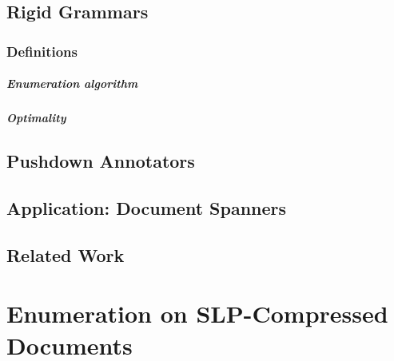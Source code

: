 \documentclass[pdftex]{pucthesis}	%
\begin{document}
\section{Rigid Grammars} \label{gram:sec:quadratic}


\subsection{Definitions}
\label{gram:sec:profile}


\paragraph{Enumeration algorithm}


\paragraph{Optimality}


\section{Pushdown Annotators} \label{gram:sec:linear}



\section{Application: Document Spanners} \label{gram:sec:spanners}

 
 
 \section{Related Work}\label{gram:sec:relwork}
 




\chapter[ENUMERATION ON SLP-COMPRESSED DOCUMENTS]{Enumeration on SLP-Compressed Documents} \label{ch3}
\end{document}
